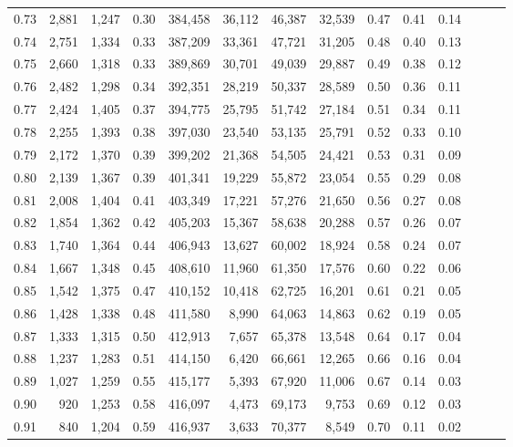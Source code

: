 \begin{tabular}{rrrrrrrrrrrrrr}
0.73 &  2,881 &  1,247 &  0.30 &  384,458 &   36,112 &  46,387 &  32,539 &  0.47 &  0.41 &      0.14 \\
0.74 &  2,751 &  1,334 &  0.33 &  387,209 &   33,361 &  47,721 &  31,205 &  0.48 &  0.40 &      0.13 \\
0.75 &  2,660 &  1,318 &  0.33 &  389,869 &   30,701 &  49,039 &  29,887 &  0.49 &  0.38 &      0.12 \\
0.76 &  2,482 &  1,298 &  0.34 &  392,351 &   28,219 &  50,337 &  28,589 &  0.50 &  0.36 &      0.11 \\
0.77 &  2,424 &  1,405 &  0.37 &  394,775 &   25,795 &  51,742 &  27,184 &  0.51 &  0.34 &      0.11 \\
0.78 &  2,255 &  1,393 &  0.38 &  397,030 &   23,540 &  53,135 &  25,791 &  0.52 &  0.33 &      0.10 \\
0.79 &  2,172 &  1,370 &  0.39 &  399,202 &   21,368 &  54,505 &  24,421 &  0.53 &  0.31 &      0.09 \\
0.80 &  2,139 &  1,367 &  0.39 &  401,341 &   19,229 &  55,872 &  23,054 &  0.55 &  0.29 &      0.08 \\
0.81 &  2,008 &  1,404 &  0.41 &  403,349 &   17,221 &  57,276 &  21,650 &  0.56 &  0.27 &      0.08 \\
0.82 &  1,854 &  1,362 &  0.42 &  405,203 &   15,367 &  58,638 &  20,288 &  0.57 &  0.26 &      0.07 \\
0.83 &  1,740 &  1,364 &  0.44 &  406,943 &   13,627 &  60,002 &  18,924 &  0.58 &  0.24 &      0.07 \\
0.84 &  1,667 &  1,348 &  0.45 &  408,610 &   11,960 &  61,350 &  17,576 &  0.60 &  0.22 &      0.06 \\
0.85 &  1,542 &  1,375 &  0.47 &  410,152 &   10,418 &  62,725 &  16,201 &  0.61 &  0.21 &      0.05 \\
0.86 &  1,428 &  1,338 &  0.48 &  411,580 &    8,990 &  64,063 &  14,863 &  0.62 &  0.19 &      0.05 \\
0.87 &  1,333 &  1,315 &  0.50 &  412,913 &    7,657 &  65,378 &  13,548 &  0.64 &  0.17 &      0.04 \\
0.88 &  1,237 &  1,283 &  0.51 &  414,150 &    6,420 &  66,661 &  12,265 &  0.66 &  0.16 &      0.04 \\
0.89 &  1,027 &  1,259 &  0.55 &  415,177 &    5,393 &  67,920 &  11,006 &  0.67 &  0.14 &      0.03 \\
0.90 &    920 &  1,253 &  0.58 &  416,097 &    4,473 &  69,173 &   9,753 &  0.69 &  0.12 &      0.03 \\
0.91 &    840 &  1,204 &  0.59 &  416,937 &    3,633 &  70,377 &   8,549 &  0.70 &  0.11 &      0.02 \\

\end{tabular}

